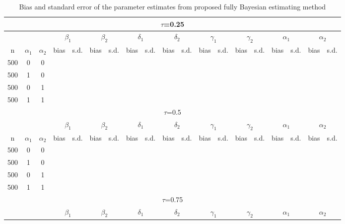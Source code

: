 \begin{sidewaystable}
\begin{center}
\caption{Bias and standard error of the parameter estimates from proposed fully Bayesian estimating method}
\begin{tabular}{ccccccccccccccccccc}
\hline
\multicolumn{19}{c}{$\tau$=0.25}\\
\hline
&&&\multicolumn{2}{c}{${\beta_1}$}&\multicolumn{2}{c}{${\beta_2}$}&\multicolumn{2}{c}{${\delta_1}$}&\multicolumn{2}{c}{${\delta_2}$}&\multicolumn{2}{c}{${\gamma_1}$}&\multicolumn{2}{c}{${\gamma_2}$}&\multicolumn{2}{c}{$\alpha_1$}&\multicolumn{2}{c}{$\alpha_2$}\\
n & $\alpha_1$ & $\alpha_2$ & bias & s.d. & bias & s.d.& bias & s.d.& bias & s.d.& bias & s.d. & bias & s.d. & bias & s.d. & bias & s.d. \\
500 & 0 & 0 &   &   &   &   &   &   &   &   & 	& 	& 	& 	& 	&	& \\
500 & 1 & 0 &   &   &   &   &   &   &   &   &   &   &   &   &   &   &   &  \\
500 & 0 & 1 & 	& 	& 	& 	& 	& 	& 	& 	& 	& 	&	& 	& 	& 	& \\
500 & 1 & 1 & 	& 	& 	& 	& 	& 	&	& 	& 	& 	& 	& 	& 	& 	& \\
\hline
\multicolumn{19}{c}{$\tau$=0.5}\\
\hline
&&&\multicolumn{2}{c}{${\beta_1}$}&\multicolumn{2}{c}{${\beta_2}$}&\multicolumn{2}{c}{${\delta_1}$}&\multicolumn{2}{c}{${\delta_2}$}&\multicolumn{2}{c}{${\gamma_1}$}&\multicolumn{2}{c}{${\gamma_2}$}&\multicolumn{2}{c}{$\alpha_1$}&\multicolumn{2}{c}{$\alpha_2$}\\
n & $\alpha_1$ & $\alpha_2$ & bias & s.d. & bias & s.d.& bias & s.d.& bias & s.d.& bias & s.d. & bias & s.d. & bias & s.d. & bias & s.d. \\
500 & 0 & 0 &   &   &   &   &   &   &   &   & 	& 	& 	& 	& 	&	&\\
500 & 1 & 0 &   &   &   &   &   &   &   &   &   &   &   &   &   &   &   &  \\
500 & 0 & 1 & 	& 	& 	& 	& 	& 	& 	& 	& 	& 	& 	& 	& 	& 	& \\
500 & 1 & 1 & 	& 	& 	& 	& 	& 	& 	& 	& 	& 	& 	& 	& 	& 	& \\
\hline
\multicolumn{19}{c}{$\tau$=0.75}\\
\hline
&&&\multicolumn{2}{c}{${\beta_1}$}&\multicolumn{2}{c}{${\beta_2}$}&\multicolumn{2}{c}{${\delta_1}$}&\multicolumn{2}{c}{${\delta_2}$}&\multicolumn{2}{c}{${\gamma_1}$}&\multicolumn{2}{c}{${\gamma_2}$}&\multicolumn{2}{c}{$\alpha_1$}&\multicolumn{2}{c}{$\alpha_2$}\\

\end{tabular}
\end{center}
\end{sidewaystable}
